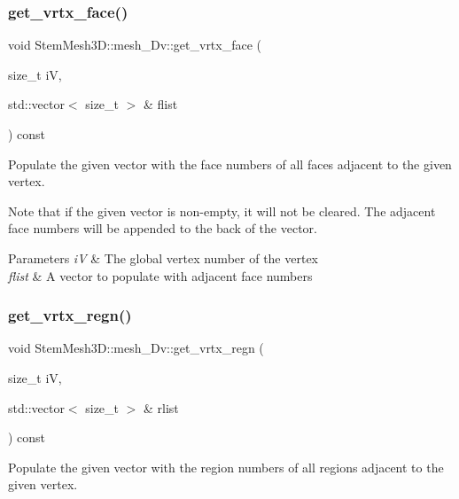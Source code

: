 \subsubsection{\texorpdfstring{get\+\_\+vrtx\+\_\+face()}{get\_vrtx\_face()}}
{\footnotesize\ttfamily void Stem\+Mesh3\+D\+::mesh\+\_\+Dv\+::get\+\_\+vrtx\+\_\+face (\begin{DoxyParamCaption}\item[{size\+\_\+t}]{iV,  }\item[{std\+::vector$<$ size\+\_\+t $>$ \&}]{flist }\end{DoxyParamCaption}) const}



Populate the given vector with the face numbers of all faces adjacent to the given vertex. 

Note that if the given vector is non-\/empty, it will not be cleared. The adjacent face numbers will be appended to the back of the vector. 
\begin{DoxyParams}{Parameters}
{\em iV} & The global vertex number of the vertex \\
\hline
{\em flist} & A vector to populate with adjacent face numbers \\
\hline
\end{DoxyParams}
\mbox{\label{classStemMesh3D_1_1mesh__3Dv_a39a03b8697cda8c74485cfc118299eea}} 
\subsubsection{\texorpdfstring{get\+\_\+vrtx\+\_\+regn()}{get\_vrtx\_regn()}}
{\footnotesize\ttfamily void Stem\+Mesh3\+D\+::mesh\+\_\+Dv\+::get\+\_\+vrtx\+\_\+regn (\begin{DoxyParamCaption}\item[{size\+\_\+t}]{iV,  }\item[{std\+::vector$<$ size\+\_\+t $>$ \&}]{rlist }\end{DoxyParamCaption}) const}



Populate the given vector with the region numbers of all regions adjacent to the given vertex. 

